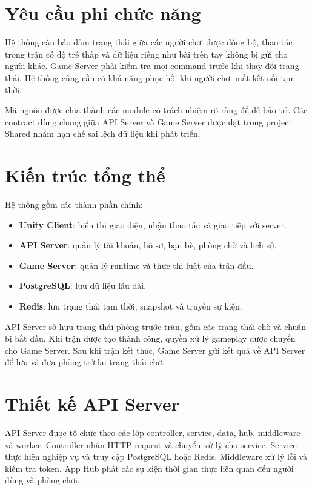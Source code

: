 \documentclass[a4paper]{report}
\begin{document}
\section{Yêu cầu phi chức năng}

Hệ thống cần bảo đảm trạng thái giữa các người chơi được đồng bộ, thao tác trong
trận có độ trễ thấp và dữ liệu riêng như bài trên tay không bị gửi cho người khác.
Game Server phải kiểm tra mọi command trước khi thay đổi trạng thái. Hệ thống
cũng cần có khả năng phục hồi khi người chơi mất kết nối tạm thời.

Mã nguồn được chia thành các module có trách nhiệm rõ ràng để dễ bảo trì. Các
contract dùng chung giữa API Server và Game Server được đặt trong project Shared
nhằm hạn chế sai lệch dữ liệu khi phát triển.

\section{Kiến trúc tổng thể}

Hệ thống gồm các thành phần chính:

\begin{itemize}
    \item \textbf{Unity Client}: hiển thị giao diện, nhận thao tác và giao tiếp với server.
    \item \textbf{API Server}: quản lý tài khoản, hồ sơ, bạn bè, phòng chờ và lịch sử.
    \item \textbf{Game Server}: quản lý runtime và thực thi luật của trận đấu.
    \item \textbf{PostgreSQL}: lưu dữ liệu lâu dài.
    \item \textbf{Redis}: lưu trạng thái tạm thời, snapshot và truyền sự kiện.
\end{itemize}

API Server sở hữu trạng thái phòng trước trận, gồm các trạng thái chờ và chuẩn
bị bắt đầu. Khi trận được tạo thành công, quyền xử lý gameplay được chuyển cho
Game Server. Sau khi trận kết thúc, Game Server gửi kết quả về API Server để lưu
và đưa phòng trở lại trạng thái chờ.

\section{Thiết kế API Server}

API Server được tổ chức theo các lớp controller, service, data, hub, middleware
và worker. Controller nhận HTTP request và chuyển xử lý cho service. Service thực
hiện nghiệp vụ và truy cập PostgreSQL hoặc Redis. Middleware xử lý lỗi và kiểm
tra token. App Hub phát các sự kiện thời gian thực liên quan đến người dùng và
phòng chơi.
\end{document}
